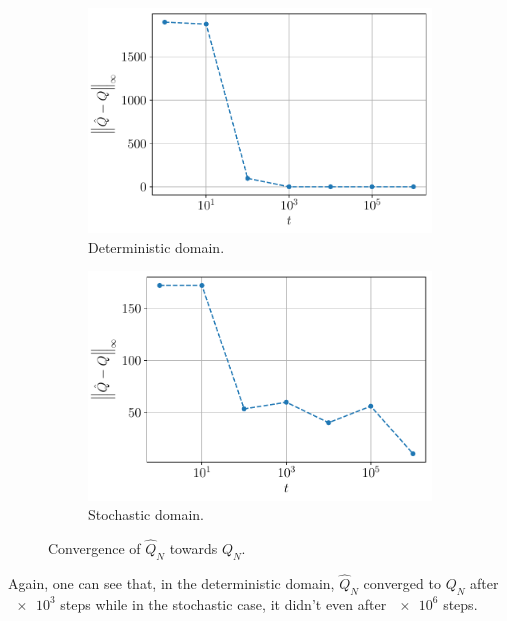 \documentclass[a4paper, 12pt]{article}
\begin{document}
    \begin{figure}[h]
        \begin{subfigure}[b]{0.47\textwidth}
            \centering
            \includegraphics[width=\textwidth]{resources/pdf/4_Q_deterministic.pdf}
            \caption{Deterministic domain.}
        \end{subfigure}
        \hfill
        \begin{subfigure}[b]{0.47\textwidth}
            \centering
            \includegraphics[width=\textwidth]{resources/pdf/4_Q_stochastic.pdf}
            \caption{Stochastic domain.}
        \end{subfigure}
        \caption{Convergence of $\hat{Q}_N$ towards $Q_N$.}
        \label{fig:si.q.convergence.speeds}
    \end{figure}
    
    Again, one can see that, in the deterministic domain, $\hat{Q}_N$ converged to $Q_N$ after $\num{e3}$ steps while in the stochastic case, it didn't even after $\num{e6}$ steps.
\end{document}
